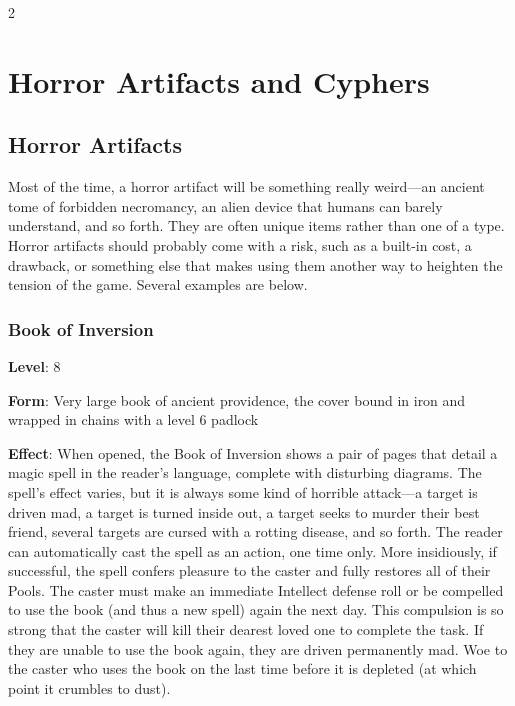 \begin{multicols}{2}

\chapter{Horror Artifacts and Cyphers}

\section{Horror Artifacts}

Most of the time, a horror artifact will be something really weird—an ancient tome of forbidden necromancy, an alien device that humans can barely understand, and so forth. They are often unique items rather than one of a type. Horror artifacts should probably come with a risk, such as a built-in cost, a drawback, or something else that makes using them another way to heighten the tension of the game. Several examples are below.

\subsection{Book of Inversion} 

\textbf{Level}: 8

\textbf{Form}: Very large book of ancient providence, the cover bound in iron and wrapped in chains with a level 6 padlock

\textbf{Effect}: When opened, the Book of Inversion shows a pair of pages that detail a magic spell in the reader’s language, complete with disturbing diagrams. The spell’s effect varies, but it is always some kind of horrible attack—a target is driven mad, a target is turned inside out, a target seeks to murder their best friend, several targets are cursed with a rotting disease, and so forth. The reader can automatically cast the spell as an action, one time only. More insidiously, if successful, the spell confers pleasure to the caster and fully restores all of their Pools. The caster must make an immediate Intellect defense roll or be compelled to use the book (and thus a new spell) again the next day. This compulsion is so strong that the caster will kill their dearest loved one to complete the task. If they are unable to use the book again, they are driven permanently mad. Woe to the caster who uses the book on the last time before it is depleted (at which point it crumbles to dust).


\end{multicols}
